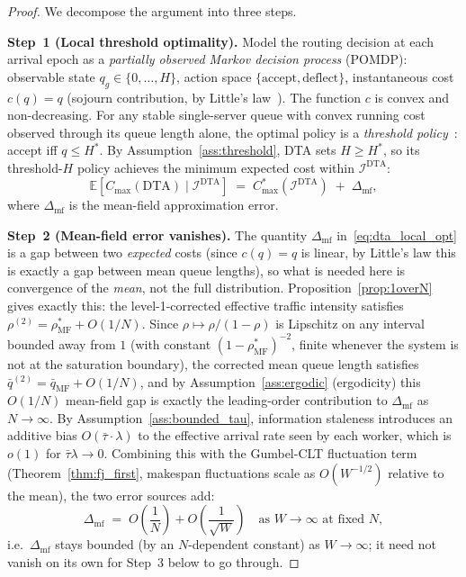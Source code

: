 \documentclass[11pt,a4paper]{report}
\newcommand{\rhostar}{\rho^{*}}
\begin{document}
\begin{proof}
We decompose the argument into three steps.

\medskip
\noindent\textbf{Step~1 (Local threshold optimality).}
Model the routing decision at each arrival epoch as a
\emph{partially observed Markov decision process} (POMDP):
observable state $q_g \in \{0,\ldots,H\}$, action space
$\{\mathrm{accept}, \mathrm{deflect}\}$, instantaneous cost
$c(q) = q$ (sojourn contribution, by Little's law~\cite{little1961}).
The function $c$ is convex and non-decreasing.
For any stable single-server queue with convex running cost observed
through its queue length alone, the optimal policy is a
\emph{threshold policy}~\cite{stidham1985}: accept iff $q \leq H^*$.
By Assumption~\ref{ass:threshold}, DTA sets $H \geq H^*$, so its
threshold-$H$ policy achieves the minimum expected cost within
$\mathcal{I}^{\mathrm{DTA}}$:
\begin{equation}\label{eq:dta_local_opt}
  \mathbb{E}[C_{\max}(\mathrm{DTA}) \mid \mathcal{I}^{\mathrm{DTA}}]
  \;=\;
  C_{\max}^*(\mathcal{I}^{\mathrm{DTA}}) \;+\; \Delta_{\mathrm{mf}},
\end{equation}
where $\Delta_{\mathrm{mf}}$ is the mean-field approximation error.

\medskip
\noindent\textbf{Step~2 (Mean-field error vanishes).}
The quantity $\Delta_{\mathrm{mf}}$ in~\eqref{eq:dta_local_opt} is a gap
between two \emph{expected} costs (since $c(q)=q$ is linear, by Little's
law this is exactly a gap between mean queue lengths), so what is needed
here is convergence of the \emph{mean}, not the full distribution.
Proposition~\ref{prop:1overN} gives exactly this: the level-1-corrected
effective traffic intensity satisfies
$\rho^{(2)} = \rhostar_{\mathrm{MF}} + O(1/N)$. Since
$\rho \mapsto \rho/(1-\rho)$ is Lipschitz on any interval bounded away
from $1$ (with constant $(1-\rhostar_{\mathrm{MF}})^{-2}$, finite
whenever the system is not at the saturation boundary), the corrected
mean queue length satisfies
$\bar q^{(2)} = \bar q_{\mathrm{MF}} + O(1/N)$, and by
Assumption~\ref{ass:ergodic} (ergodicity) this $O(1/N)$ mean-field gap
is exactly the leading-order contribution to $\Delta_{\mathrm{mf}}$ as
$N\to\infty$. By Assumption~\ref{ass:bounded_tau}, information staleness introduces
an additive bias $O(\bar\tau \cdot \lambda)$ to the effective arrival
rate seen by each worker, which is $o(1)$ for $\bar\tau \lambda \to 0$.
Combining this with the Gumbel-CLT fluctuation term (Theorem~\ref{thm:fj_first},
makespan fluctuations scale as $O(W^{-1/2})$ relative to the mean), the two
error sources add:
\[
  \Delta_{\mathrm{mf}} \;=\; O\!\left(\frac{1}{N}\right) + O\!\left(\frac{1}{\sqrt{W}}\right)
  \quad\text{as } W \to \infty \text{ at fixed } N,
\]
i.e.\ $\Delta_{\mathrm{mf}}$ stays bounded (by an $N$-dependent constant) as
$W\to\infty$; it need not vanish on its own for Step~3 below to go through.


\end{proof}
\end{document}

